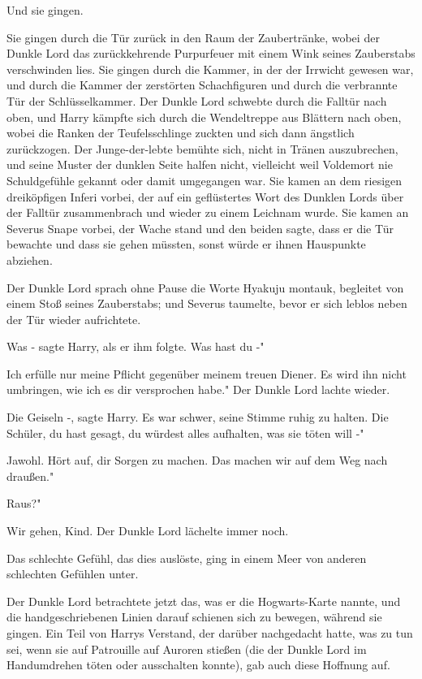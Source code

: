 Und sie gingen.

Sie gingen durch die Tür zurück in den Raum der Zaubertränke, wobei der Dunkle
Lord das zurückkehrende Purpurfeuer mit einem Wink seines Zauberstabs
verschwinden lies. Sie gingen durch die Kammer, in der der Irrwicht gewesen war,
und durch die Kammer der zerstörten Schachfiguren und durch die verbrannte Tür
der Schlüsselkammer. Der Dunkle Lord schwebte durch die Falltür nach oben, und
Harry kämpfte sich durch die Wendeltreppe aus Blättern nach oben, wobei die
Ranken der Teufelsschlinge zuckten und sich dann ängstlich zurückzogen. Der
Junge-der-lebte bemühte sich, nicht in Tränen auszubrechen, und seine Muster der
dunklen Seite halfen nicht, vielleicht weil Voldemort nie Schuldgefühle gekannt
oder damit umgegangen war. Sie kamen an dem riesigen dreiköpfigen Inferi vorbei,
der auf ein geflüstertes Wort des Dunklen Lords über der Falltür zusammenbrach
und wieder zu einem Leichnam wurde. Sie kamen an Severus Snape vorbei, der Wache
stand und den beiden sagte, dass er die Tür bewachte und dass sie gehen müssten,
sonst würde er ihnen Hauspunkte abziehen.

Der Dunkle Lord sprach ohne Pause die Worte \glqq Hyakuju montauk\grqq{},
begleitet von einem Stoß seines Zauberstabs; und Severus taumelte, bevor er sich
leblos neben der Tür wieder aufrichtete.

\glqq Was -\grqq{} sagte Harry, als er ihm folgte. \glqq Was hast du -"

\glqq Ich erfülle nur meine Pflicht gegenüber meinem treuen Diener. Es wird ihn
nicht umbringen, wie ich es dir versprochen habe." Der Dunkle Lord lachte
wieder.

\glqq Die Geiseln -\grqq{}, sagte Harry. Es war schwer, seine Stimme ruhig zu
halten. \glqq Die Schüler, du hast gesagt, du würdest alles aufhalten, was sie
töten will -"

\glqq Jawohl. Hört auf, dir Sorgen zu machen. Das machen wir auf dem Weg nach
draußen."

\glqq Raus?"

\glqq Wir gehen, Kind.\grqq{} Der Dunkle Lord lächelte immer noch.

Das schlechte Gefühl, das dies auslöste, ging in einem Meer von anderen
schlechten Gefühlen unter.

Der Dunkle Lord betrachtete jetzt das, was er die Hogwarts-Karte nannte, und die
handgeschriebenen Linien darauf schienen sich zu bewegen, während sie gingen.
Ein Teil von Harrys Verstand, der darüber nachgedacht hatte, was zu tun sei,
wenn sie auf Patrouille auf Auroren stießen (die der Dunkle Lord im Handumdrehen
töten oder ausschalten konnte), gab auch diese Hoffnung auf.


